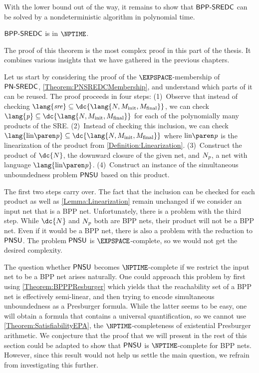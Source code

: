 \documentclass[../../diss.tex]{subfiles}
\begin{document}
With the lower bound out of the way, it remains to show that $\mathsf{BPP\text{-}SREDC}$ can be solved by a nondeterministic algorithm in polynomial time.

\begin{theorem}%
\label{Theorem:SREBPPDCMembership}%
    $\mathsf{BPP\text{-}SREDC}$ is in $\NPTIME$.
\end{theorem}

The proof of this theorem is the most complex proof in this part of the thesis.
It combines various insights that we have gathered in the previous chapters.

Let us start by considering the proof of the $\EXPSPACE$-membership of $\mathsf{PN\text{-}SREDC}$, \cref{Theorem:PNSREDCMembership}, and understand which parts of it can be reused.
The proof proceeds in four steps:
(1)~Observe that instead of checking $\lang{\sre} \subseteq \dc{\lang{N,\Minit,\Mfinal}}$, we can check $\lang{\product} \subseteq \dc{\lang{N,\Minit,\Mfinal}}$ for each of the polynomially many products of the SRE.\@
(2)~Instead of checking this inclusion, we can check $\lang{\linof{\product}} \subseteq \dc{\lang{N,\Minit,\Mfinal}}$ where $\linof{\product}$ is the linearization of the product from \cref{Definition:Linearization}.
(3)~Construct the product of $\dc{N}$, the downward closure of the given net, and $N_{\mathit{p}}$, a net with language $\lang{\linof{\product}}$.
(4)~Construct an instance of the simultaneous unboundedness problem $\mathsf{PNSU}$ based on this product.

The first two steps carry over.
The fact that the inclusion can be checked for each product as well as \cref{Lemma:Linearization} remain unchanged if we consider an input net that is a BPP net.
Unfortunately, there is a problem with the third step.
While $\dc{N}$ and $N_{\mathit{p}}$ both are BPP nets, their product will not be a BPP net.
Even if it would be a BPP net, there is also a problem with the reduction to $\mathsf{PNSU}$. The problem $\mathsf{PNSU}$ is $\EXPSPACE$-complete, so we would not get the desired complexity.

The question whether $\mathsf{PNSU}$ becomes $\NPTIME$-complete if we restrict the input net to be a BPP net arises naturally.
One could approach this problem by first using \cref{Theorem:BPPPResburger} which yields that the reachability set of a BPP net is effectively semi-linear, and then trying to encode simultaneous unboundedness as a Presburger formula.
While the latter seems to be easy, one will obtain a formula that contains a universal quantification, so we cannot use \cref{Theorem:SatisfiabilityEPA}, the $\NPTIME$-completeness of existential Presburger arithmetic.
We conjecture that the proof that we will present in the rest of this section could be adapted to show that $\mathsf{PNSU}$ is $\NPTIME$-complete for BPP nets.
However, since this result would not help us settle the main question, we refrain from investigating this further.
\end{document}
